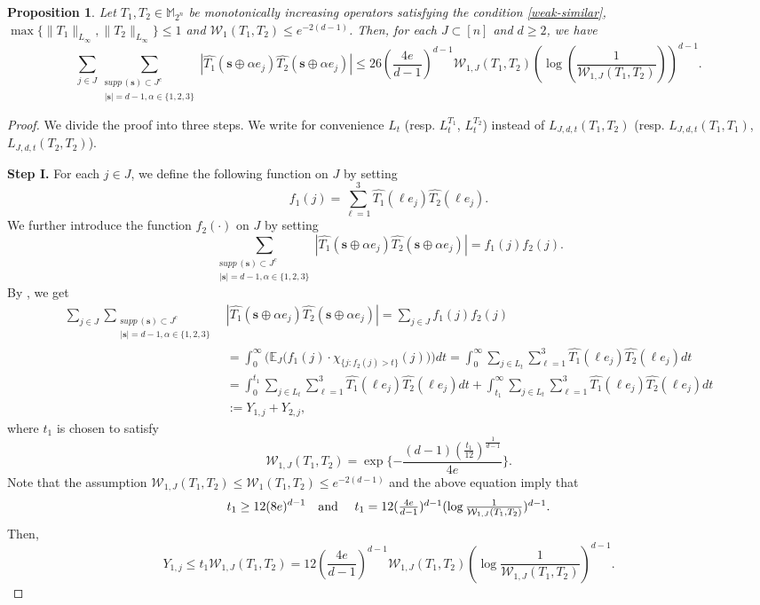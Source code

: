 \documentclass{amsbook}
\newtheorem{proposition}[theorem]{Proposition}
\theoremstyle{definition}
\theoremstyle{remark}
\numberwithin{section}{chapter}
\numberwithin{equation}{chapter}
\newcommand{\1}{\mathbf{1}}
\newcommand{\s}{\mathbf{s}}
\newcommand{\supp}{{\mathrm supp}\,}
\begin{document}
\begin{proposition}\label{tala-correlation-pro2} Let $T_1,T_2\in\mathbb{M}_{2^n}$ be  monotonically increasing operators satisfying the condition \eqref{weak-similar},  $\max\{\|T_1\|_{L_\infty},\|T_2\|_{L_\infty}\}\leq1$ and $\mathcal{W}_1(T_1,T_2)\leq e^{-2(d-1)}$. Then, for each $J\subset [n]$ and  $d\geq2$, we have
	$$\sum_{j\in J}\sum_{\substack{\supp(\mathbf{s})\subset J^c \\ |\mathbf{s}|=d-1,\alpha\in\{1,2,3\}}}\left|\widehat{T_1}(\s\oplus \alpha e_j)\widehat{T_2}(\s\oplus \alpha e_j)\right|\leq 26\left(\frac{4e}{d-1}\right)^{d-1}\mathcal{W}_{1,J}(T_1,T_2)\left(\log\left(\frac{1}{\mathcal{W}_{1,J}(T_1,T_2)}\right)\right)^{d-1}.$$
\end{proposition}
\begin{proof} 
	We divide the proof into three steps. We write for convenience $L_t$ (resp. $L_t^{T_1}$, $L_t^{T_2}$) instead of $L_{J,d,t}(T_1,T_2)$ (resp.  $L_{J,d,t}(T_1,T_1)$, $L_{J,d,t}(T_2,T_2)$).
	
	
	\textbf{Step I.} For each $j\in J$, we define the following function on $J$ by setting
	$$f_1(j)=\sum_{\ell=1}^3\widehat{T_1}(\ell e_j)\widehat{T_2}(\ell e_j).$$
We further introduce the function $f_2(\cdot)$ on $J$ by setting
	$$\sum_{\substack{\supp(\mathbf{s})\subset J^c \\ |\mathbf{s}|=d-1,\alpha\in\{1,2,3\}}}\left|\widehat{T_1}(\s\oplus \alpha e_j)\widehat{T_2}(\s\oplus \alpha e_j)\right|=f_1(j)f_2(j).$$
	By  \cite[Lemma 11]{KK2013}, we get
	\begin{align*}
		\sum_{j\in J}\sum_{\substack{\supp(\mathbf{s})\subset J^c \\ |\mathbf{s}|=d-1,\alpha\in\{1,2,3\}}}&\left|\widehat{T_1}(\s\oplus \alpha e_j)\widehat{T_2}(\s\oplus \alpha e_j)\right|=\sum_{j\in J} f_1(j)f_2(j)\\
		&=\int_0^\infty\big(\mathbb{E}_J\big(f_1(j)\cdot\chi_{\{j:f_2(j)>t\}}(j)\big)\big)dt=\int_0^\infty \sum_{j\in L_t}\sum_{\ell=1}^3\widehat{T_1}(\ell e_j)\widehat{T_2}(\ell e_j)dt\\
		&=\int_{0}^{t_1} \sum_{j\in L_t}\sum_{\ell=1}^3\widehat{T_1}(\ell e_j)\widehat{T_2}(\ell e_j)dt
		+\int_{t_1}^{\infty} \sum_{j\in L_t}\sum_{\ell=1}^3\widehat{T_1}(\ell e_j)\widehat{T_2}(\ell e_j)dt\\
		&:=Y_{1,j}+Y_{2,j},
	\end{align*}
	where $t_1$ is chosen to satisfy
	\begin{equation}\label{t1}
		\mathcal{W}_{1,J}(T_1,T_2)=\exp\{-\frac{(d-1)(\frac{t_1}{12})^{\frac{1}{d-1}}}{4e}\}.
	\end{equation}
	Note that the assumption $\mathcal{W}_{1,J}(T_1,T_2)\leq \mathcal{W}_1(T_1,T_2)\leq e^{-2(d-1)}$ and  the above equation  imply that
	$$t_1\geq 12(8e)^{d-1}\quad\mbox{and \quad $t_1=12(\frac{4e}{d-1})^{d-1}(\log\frac{1}{\mathcal{W}_{1,J}(T_1,T_2)})^{d-1}$}.$$
	Then,
	\begin{equation}\label{y1j}
		Y_{1,j}\leq t_{1}\mathcal{W}_{1,J}(T_1,T_2)=12(\frac{4e}{d-1})^{d-1}\mathcal{W}_{1,J}(T_1,T_2)\left(\log\frac{1}{\mathcal{W}_{1,J}(T_1,T_2)}\right)^{d-1}.
	\end{equation}
	

\end{proof}
\end{document}
